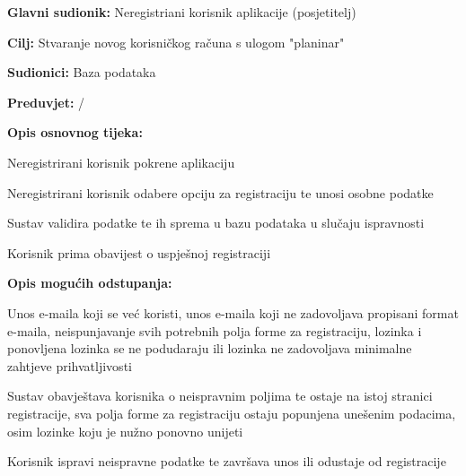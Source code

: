				
				\noindent {}
			\begin{packed_item}
				
				\item \textbf{Glavni sudionik: }$ $Neregistriani korisnik aplikacije (posjetitelj)$ $
				\item  \textbf{Cilj:} $ $Stvaranje novog korisničkog računa s ulogom "planinar"$ $
				\item  \textbf{Sudionici:} $ $Baza podataka$ $
				\item  \textbf{Preduvjet:} $ $/$ $
				\item  \textbf{Opis osnovnog tijeka:}
				
				\item[] \begin{packed_enum}
					
					\item $ $Neregistrirani korisnik pokrene aplikaciju$ $
					\item $ $Neregistrirani korisnik odabere opciju za registraciju te unosi osobne podatke$ $
					\item $ $Sustav validira podatke te ih sprema u bazu podataka u slučaju ispravnosti$ $
					\item $ $Korisnik prima obavijest o uspješnoj registraciji$ $
				\end{packed_enum}
				
				\item  \textbf{Opis mogućih odstupanja:}
				
				\item[] \begin{packed_item}
					
					\item[3.a] $ $Unos e-maila koji se već koristi, unos e-maila koji ne zadovoljava propisani format e-maila, neispunjavanje svih potrebnih polja forme za registraciju, lozinka i ponovljena lozinka se ne podudaraju ili lozinka ne zadovoljava minimalne zahtjeve prihvatljivosti$ $
					
					\item[] \begin{packed_enum}
						
						\item $ $Sustav obavještava korisnika o neispravnim poljima te ostaje na istoj stranici registracije, sva polja forme za registraciju ostaju popunjena unešenim podacima, osim lozinke koju je nužno ponovno unijeti$ $
						\item $ $Korisnik ispravi neispravne podatke te završava unos ili odustaje od registracije$ $
						
					\end{packed_enum}
				\end{packed_item}
			\end{packed_item}
		
